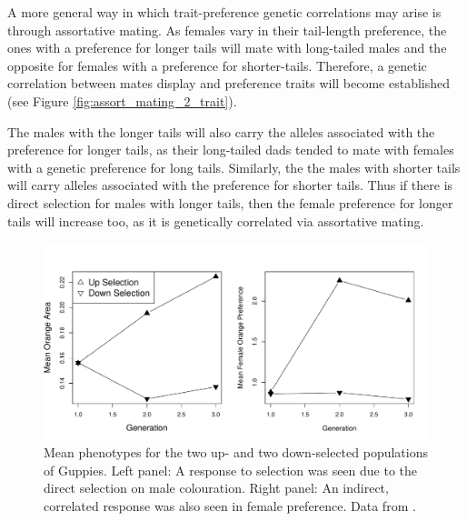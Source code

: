 A more general way in which trait-preference genetic correlations may arise is through assortative mating. As females vary in their
tail-length preference, the ones with a preference for longer
tails will mate with long-tailed males and the opposite for females
with a preference for shorter-tails. Therefore, a
genetic correlation between mates display and preference traits will
become established (see Figure \ref{fig:assort_mating_2_trait}). 

The males with the longer tails will also carry the alleles
associated with the preference for longer tails, as their long-tailed
dads tended to mate with females with a genetic preference for long
tails. Similarly, the the males with shorter tails will carry alleles associated with the preference for
shorter tails. Thus if there is direct selection for males with longer tails, then
the female preference for longer tails will increase too, as it is
genetically correlated via assortative mating. 

\begin{figure}
\begin{center}
\includegraphics[width=\textwidth]{Journal_figs/Quant_gen/guppies_female_choice/guppies_female_choice.pdf}
\end{center} \label{fig:assort_mating_guppies}
\caption{Mean phenotypes for the two up- and two down-selected
  populations of Guppies. Left panel: A response to selection was seen
  due to the direct selection on male colouration. Right panel: An
  indirect, correlated response was also seen in female
  preference. Data from \citet{houde:94}. }
\end{figure}

